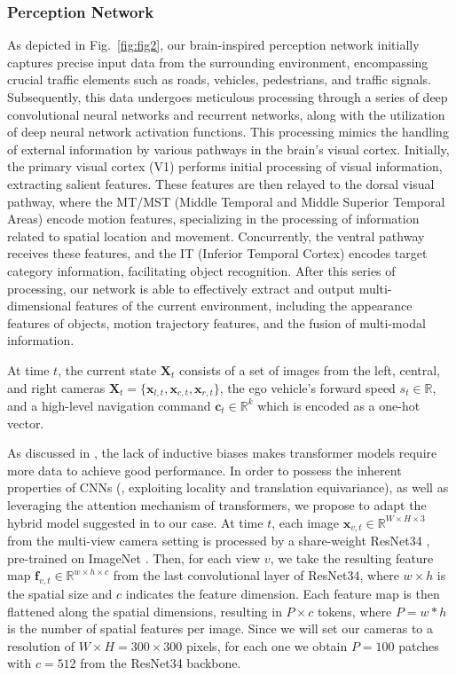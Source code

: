 \subsubsection{Perception Network}
As depicted in Fig.~\ref{fig:fig2}, our brain-inspired perception network initially captures precise input data from the surrounding environment, encompassing crucial traffic elements such as roads, vehicles, pedestrians, and traffic signals. 
Subsequently, this data undergoes meticulous processing through a series of deep convolutional neural networks and recurrent networks, along with the utilization of deep neural network activation functions. 
This processing mimics the handling of external information by various pathways in the brain's visual cortex. 
Initially, the primary visual cortex (V1) performs initial processing of visual information, extracting salient features.
These features are then relayed to the dorsal visual pathway, where the MT/MST (Middle Temporal and Middle Superior Temporal Areas) encode motion features, specializing in the processing of information related to spatial location and movement.
Concurrently, the ventral pathway receives these features, and the IT (Inferior Temporal Cortex) encodes target category information, facilitating object recognition. 
After this series of processing, our network is able to effectively extract and output multi-dimensional features of the current environment, including the appearance features of objects, motion trajectory features, and the fusion of multi-modal information.


At time $t$, the current state $\mathbf{X}_t$ consists of a set of images from the left, central, and right cameras $\mathbf{X}_{t}=\{\mathbf{x}_{l,t}, \mathbf{x}_{c,t}, \mathbf{x}_{r,t} \}$, the ego vehicle's forward speed $s_t\in\mathbb{R}$, and a high-level navigation command $\mathbf{c}_t\in\mathbb{R}^{k}$ which is encoded as a one-hot vector. 


As discussed in \cite{Alexey:2021}, the lack of inductive biases makes transformer models require more data to achieve good performance. 
In order to possess the inherent properties of CNNs (\ie, exploiting locality and translation equivariance), as well as leveraging the attention mechanism of transformers, we propose to adapt the hybrid model suggested in \cite{Alexey:2021} to our case. 
At time $t$, each image $\mathbf{x}_{v,t}\in \mathbb{R}^{W\times H\times 3}$ from the multi-view camera setting is processed by a share-weight ResNet34 \cite{He:2016}, pre-trained on ImageNet \cite{Deng:2009}. 
Then, for each view $v$, we take the resulting feature map $\mathbf{f}_{v,t}\in\mathbb{R}^{w\times h\times c}$ from the last convolutional layer of ResNet34, where $w\times h$ is the spatial size and $c$ indicates the feature dimension. 
Each feature map is then flattened along the spatial dimensions, resulting in $P\times c$ tokens, where $P=w*h$ is the number of spatial features per image. 
Since we will set our cameras to a resolution of $W\times H=300\times300$ pixels, for each one we obtain $P=100$ patches with $c=512$ from the ResNet34 backbone. 


